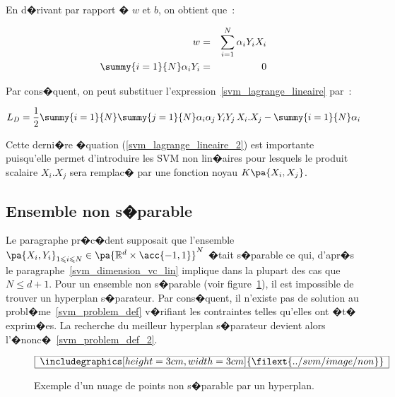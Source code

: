 En d�rivant par rapport � $w$ et $b$, on obtient que~:

        \begin{eqnarray}
        w                                                     &=& \sum_{i=1}^N \alpha_i Y_i X_i \\
        \summy{i=1}{N} \alpha_i Y_i &=& 0
        \end{eqnarray}
        
Par cons�quent, on peut substituer l'expression~\ref{svm_lagrange_lineaire} par~:

            \begin{eqnarray}
            L_D = \frac{1}{2} \summy{i=1}{N}\summy{j=1}{N} 
                                \alpha_i \alpha_j \, Y_i Y_j \, X_i . X_j - 
                                \summy{i=1}{N} \alpha_i
            \label{svm_lagrange_lineaire_2}
            \end{eqnarray}

Cette derni�re �quation (\ref{svm_lagrange_lineaire_2}) est importante puisqu'elle permet d'introduire les SVM non lin�aires pour lesquels le produit scalaire $X_i. X_j$ sera remplac� par une fonction noyau $K\pa{X_i, X_j}$. 




\subsection{Ensemble non s�parable}

Le paragraphe pr�c�dent supposait que l'ensemble $\pa{X_i,Y_i}_{1 \leqslant i \leqslant N} \in \pa{ \mathbb{R}^d \times \acc{-1,1} }^N$ �tait s�parable ce qui, d'apr�s le paragraphe~\ref{svm_dimension_vc_lin} implique dans la plupart des cas que $N \leqslant d+1$. Pour un ensemble non s�parable (voir figure~\ref{svm_non_separable_fig}), il est impossible de trouver un hyperplan s�parateur. Par cons�quent, il n'existe pas de solution au probl�me~\ref{svm_problem_def} v�rifiant les contraintes telles qu'elles ont �t� exprim�es. La recherche du meilleur hyperplan s�parateur devient alors l'�nonc�~\ref{svm_problem_def_2}.


        \begin{figure}[ht]
    $$\frame{$\begin{array}[c|c]{c}\includegraphics[height=3cm, width=3cm]
    {\filext{../svm/image/non}}\end{array}$}$$
    \caption{    Exemple d'un nuage de points non s�parable par un hyperplan.}
    \label{svm_non_separable_fig}
        \end{figure}




